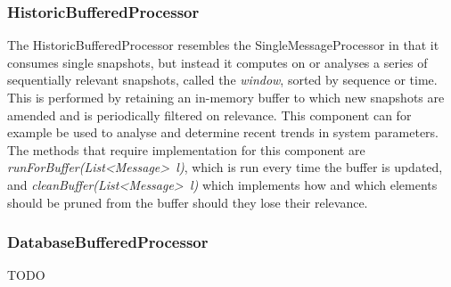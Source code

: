 \subsubsection*{HistoricBufferedProcessor}
The HistoricBufferedProcessor resembles the SingleMessageProcessor in that it consumes single snapshots, but instead it computes on or analyses a series of sequentially relevant snapshots, called the \emph{window}, sorted by sequence or time. This is performed by retaining an in-memory buffer to which new snapshots are amended and is periodically filtered on relevance. This component can for example be used to analyse and determine recent trends in system parameters. The methods that require implementation for this component are \emph{runForBuffer(List\textless Message\textgreater\ l)}, which is run every time the buffer is updated, and \emph{cleanBuffer(List\textless Message\textgreater\ l)} which implements how and which elements should be pruned from the buffer should they lose their relevance.

\subsubsection{DatabaseBufferedProcessor}
TODO

